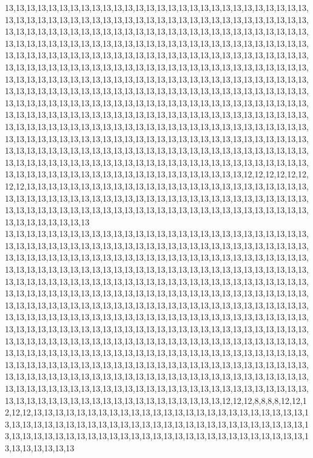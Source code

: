 13,13,13,13,13,13,13,13,13,13,13,13,13,13,13,13,13,13,13,13,13,13,13,13,13,13,13,13,13,13,13,13,13,13,13,13,13,13,13,13,13,13,13,13,13,13,13,13,13,13,13,13,13,13,13,13,13,13,13,13,13,13,13,13,13,13,13,13,13,13,13,13,13,13,13,13,13,13,13,13,13,13,13,13,13,13,13,13,13,13,13,13,13,13,13,13,13,13,13,13,13,13,13,13,13,13,13,13,13,13,13,13,13,13,13,13,13,13,13,13,13,13,13,13,13,13,13,13,13,13,13,13,13,13,13,13,13,13,13,13,13,13,13,13,13,13,13,13,13,13,13,13,13,13,13,13,13,13,13,13,13,13,13,13,13,13,13,13,13,13,13,13,13,13,13,13,13,13,13,13,13,13,13,13,13,13,13,13,13,13,13,13,13,13,13,13,13,13,13,13,13,13,13,13,13,13,13,13,13,13,13,13,13,13,13,13,13,13,13,13,13,13,13,13,13,13,13,13,13,13,13,13,13,13,13,13,13,13,13,13,13,13,13,13,13,13,13,13,13,13,13,13,13,13,13,13,13,13,13,13,13,13,13,13,13,13,13,13,13,13,13,13,13,13,13,13,13,13,13,13,13,13,13,13,13,13,13,13,13,13,13,13,13,13,13,13,13,13,13,13,13,13,13,13,13,13,13,13,13,13,13,13,13,13,13,13,13,13,13,13,13,13,13,13,13,13,13,13,13,13,13,13,13,13,13,13,13,13,13,13,13,13,13,13,13,13,13,13,13,13,13,13,13,13,13,13,13,13,13,13,13,13,13,13,13,13,13,13,13,13,13,13,13,13,13,13,13,13,13,13,13,13,13,13,13,13,13,13,13,13,13,13,13,13,13,13,13,13,13,13,13,13,13,13,13,13,13,13,13,13,13,13,13,13,12,12,12,12,12,12,12,12,13,13,13,13,13,13,13,13,13,13,13,13,13,13,13,13,13,13,13,13,13,13,13,13,13,13,13,13,13,13,13,13,13,13,13,13,13,13,13,13,13,13,13,13,13,13,13,13,13,13,13,13,13,13,13,13,13,13,13,13,13,13,13,13,13,13,13,13,13,13,13,13,13,13,13,13,13,13,13,13,13,13,13,13,13,13,13,13,13,13
13,13,13,13,13,13,13,13,13,13,13,13,13,13,13,13,13,13,13,13,13,13,13,13,13,13,13,13,13,13,13,13,13,13,13,13,13,13,13,13,13,13,13,13,13,13,13,13,13,13,13,13,13,13,13,13,13,13,13,13,13,13,13,13,13,13,13,13,13,13,13,13,13,13,13,13,13,13,13,13,13,13,13,13,13,13,13,13,13,13,13,13,13,13,13,13,13,13,13,13,13,13,13,13,13,13,13,13,13,13,13,13,13,13,13,13,13,13,13,13,13,13,13,13,13,13,13,13,13,13,13,13,13,13,13,13,13,13,13,13,13,13,13,13,13,13,13,13,13,13,13,13,13,13,13,13,13,13,13,13,13,13,13,13,13,13,13,13,13,13,13,13,13,13,13,13,13,13,13,13,13,13,13,13,13,13,13,13,13,13,13,13,13,13,13,13,13,13,13,13,13,13,13,13,13,13,13,13,13,13,13,13,13,13,13,13,13,13,13,13,13,13,13,13,13,13,13,13,13,13,13,13,13,13,13,13,13,13,13,13,13,13,13,13,13,13,13,13,13,13,13,13,13,13,13,13,13,13,13,13,13,13,13,13,13,13,13,13,13,13,13,13,13,13,13,13,13,13,13,13,13,13,13,13,13,13,13,13,13,13,13,13,13,13,13,13,13,13,13,13,13,13,13,13,13,13,13,13,13,13,13,13,13,13,13,13,13,13,13,13,13,13,13,13,13,13,13,13,13,13,13,13,13,13,13,13,13,13,13,13,13,13,13,13,13,13,13,13,13,13,13,13,13,13,13,13,13,13,13,13,13,13,13,13,13,13,13,13,13,13,13,13,13,13,13,13,13,13,13,13,13,13,13,13,13,13,13,13,13,13,13,13,13,13,13,13,13,13,13,13,13,13,13,13,13,13,13,13,13,13,13,13,12,12,12,8,8,8,8,12,12,12,12,12,13,13,13,13,13,13,13,13,13,13,13,13,13,13,13,13,13,13,13,13,13,13,13,13,13,13,13,13,13,13,13,13,13,13,13,13,13,13,13,13,13,13,13,13,13,13,13,13,13,13,13,13,13,13,13,13,13,13,13,13,13,13,13,13,13,13,13,13,13,13,13,13,13,13,13,13,13,13,13,13,13,13,13,13,13,13,13,13
